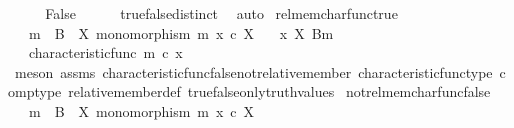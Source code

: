 \begin{isabellebody}
\ \ \isamarkupfalse%
\ \isamarkupfalse%
\ False\isanewline
\ \ \ \ \isamarkupfalse%
\ true{\isacharunderscore}{\kern0pt}false{\isacharunderscore}{\kern0pt}distinct\ \isamarkupfalse%
\ auto\isanewline
{}\isamarkupfalse%
%
\endisatagproof
{\isafoldproof}%
%
\isadelimproof
\isanewline
%
\endisadelimproof
\isanewline
{}\isamarkupfalse%
\ rel{\isacharunderscore}{\kern0pt}mem{\isacharunderscore}{\kern0pt}char{\isacharunderscore}{\kern0pt}func{\isacharunderscore}{\kern0pt}true{\isacharcolon}{\kern0pt}\isanewline
\ \ \ {\isachardoublequoteopen}m\ {\isacharcolon}{\kern0pt}\ B\ {\isasymrightarrow}\ X{\isachardoublequoteclose}\ {\isachardoublequoteopen}monomorphism\ m{\isachardoublequoteclose}\ {\isachardoublequoteopen}x\ {\isasymin}\isactrlsub c\ X{\isachardoublequoteclose}\isanewline
\ \ \ {\isachardoublequoteopen}x\ {\isasymin}\isactrlbsub X\isactrlesub \ {\isacharparenleft}{\kern0pt}B{\isacharcomma}{\kern0pt}m{\isacharparenright}{\kern0pt}{\isachardoublequoteclose}\isanewline
\ \ \ {\isachardoublequoteopen}characteristic{\isacharunderscore}{\kern0pt}func\ m\ {\isasymcirc}\isactrlsub c\ x\ {\isacharequal}{\kern0pt}\ {\isasymt}{\isachardoublequoteclose}\isanewline
%
\isadelimproof
\ \ %
\endisadelimproof
%
\isatagproof
{}\isamarkupfalse%
\ {\isacharparenleft}{\kern0pt}meson\ assms{\isacharparenleft}{\kern0pt}{}{\isacharparenright}{\kern0pt}\ characteristic{\isacharunderscore}{\kern0pt}func{\isacharunderscore}{\kern0pt}false{\isacharunderscore}{\kern0pt}not{\isacharunderscore}{\kern0pt}relative{\isacharunderscore}{\kern0pt}member\ characteristic{\isacharunderscore}{\kern0pt}func{\isacharunderscore}{\kern0pt}type\ comp{\isacharunderscore}{\kern0pt}type\ relative{\isacharunderscore}{\kern0pt}member{\isacharunderscore}{\kern0pt}def{}\ true{\isacharunderscore}{\kern0pt}false{\isacharunderscore}{\kern0pt}only{\isacharunderscore}{\kern0pt}truth{\isacharunderscore}{\kern0pt}values{\isacharparenright}{\kern0pt}%
\endisatagproof
{\isafoldproof}%
%
\isadelimproof
\isanewline
%
\endisadelimproof
\isanewline
{}\isamarkupfalse%
\ not{\isacharunderscore}{\kern0pt}rel{\isacharunderscore}{\kern0pt}mem{\isacharunderscore}{\kern0pt}char{\isacharunderscore}{\kern0pt}func{\isacharunderscore}{\kern0pt}false{\isacharcolon}{\kern0pt}\isanewline
\ \ \ {\isachardoublequoteopen}m\ {\isacharcolon}{\kern0pt}\ B\ {\isasymrightarrow}\ X{\isachardoublequoteclose}\ {\isachardoublequoteopen}monomorphism\ m{\isachardoublequoteclose}\ {\isachardoublequoteopen}x\ {\isasymin}\isactrlsub c\ X{\isachardoublequoteclose}\isanewline

\end{isabellebody}
